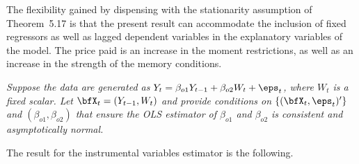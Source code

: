 The flexibility gained by dispensing with the stationarity assumption of Theorem~5.17 is that the present result can accommodate the inclusion of fixed regressors as well as lagged dependent variables in the explanatory variables of the model. The price paid is an increase in the moment restrictions, as well as an increase in the strength of the memory conditions.

\begin{exercises}

\item\label{ex:ar1-mixing} \textit{Suppose the data are generated as $Y_t = \beta_{o1}Y_{t-1} + \beta_{o2}W_t + \eps_t$, where $W_t$ is a fixed scalar. Let $\bfX_t = (Y_{t-1}, W_t)$ and provide conditions on $\{(\bfX_t, \eps_t)'\}$ and $(\beta_{o1}, \beta_{o2})$ that ensure the OLS estimator of $\beta_{o1}$ and $\beta_{o2}$ is consistent and asymptotically normal.}

\end{exercises}

The result for the instrumental variables estimator is the following.

